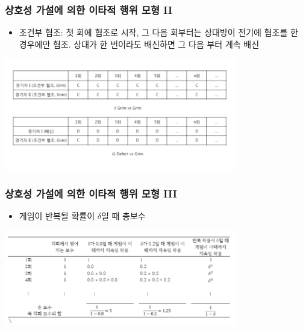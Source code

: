 \documentclass[final]{beamer}
\begin{document}
\begin{frame}\frametitle{상호성 가설에 의한 이타적 행위 모형 II}%
\begin{itemize}\large
\item 조건부 협조: 첫 회에 협조로 시작, 그 다음 회부터는 상대방이 전기에 협조를 한 경우에만 협조. 상대가 한 번이라도 배신하면 그 다음 부터 계속 배신 \\
\end{itemize}
\begin{center}
\includegraphics[width=4in]{condcoop01.png}
\end{center}
\end{frame}

\begin{frame}\frametitle{상호성 가설에 의한 이타적 행위 모형 III}\vspace{5mm}
\begin{itemize}\large
\item 게임이 반복될 확률이 $\delta$일 때 총보수
\end{itemize}
\begin{center}
\includegraphics[width=4in]{repeatpayoff01.png}
\end{center}
\end{frame}
\end{document}
